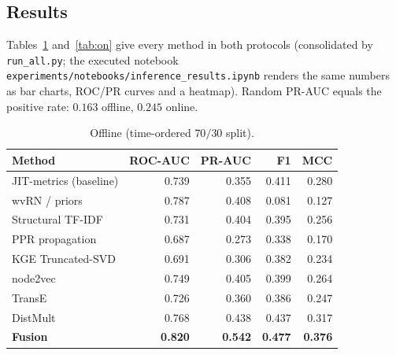 \documentclass[11pt,a4paper]{article}
\begin{document}
	\subsection{Results}
	Tables~\ref{tab:off} and~\ref{tab:on} give every method in both protocols
	(consolidated by \texttt{run\_all.py}; the executed notebook
	\texttt{experiments/notebooks/inference\_results.ipynb} renders the same numbers
	as bar charts, ROC/PR curves and a heatmap). Random PR-AUC equals the positive
	rate: $0.163$ offline, $0.245$ online.
	
	\begin{table}[h]\centering\small
		\caption{Offline (time-ordered $70/30$ split).}\label{tab:off}
		\begin{tabular}{@{}lrrrr@{}}
			\toprule
			\textbf{Method} & \textbf{ROC-AUC} & \textbf{PR-AUC} & \textbf{F1} & \textbf{MCC}\\
			\midrule
			JIT-metrics (baseline) & 0.739 & 0.355 & 0.411 & 0.280\\
			wvRN / priors          & 0.787 & 0.408 & 0.081 & 0.127\\
			Structural TF-IDF      & 0.731 & 0.404 & 0.395 & 0.256\\
			PPR propagation        & 0.687 & 0.273 & 0.338 & 0.170\\
			KGE Truncated-SVD      & 0.691 & 0.306 & 0.382 & 0.234\\
			node2vec               & 0.749 & 0.405 & 0.399 & 0.264\\
			TransE                 & 0.726 & 0.360 & 0.386 & 0.247\\
			DistMult               & 0.768 & 0.438 & 0.437 & 0.317\\
			\textbf{Fusion}        & \textbf{0.820} & \textbf{0.542} & \textbf{0.477} & \textbf{0.376}\\
			\bottomrule
		\end{tabular}
	\end{table}
	
\end{document}
